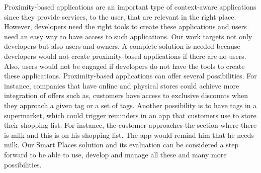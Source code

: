 Proximity-based applications are an important type of context-aware applications since they provide services, to the user, that are relevant in the right place.
However, developers need the right tools to create these applications and users need an easy way to have access to such applications.
Our work targets not only developers but also users and owners.
A complete solution is needed because developers would not create proximity-based applications if there are no users.
Also, users would not be engaged if developers do not have the tools to create these applications.
Proximity-based applications can offer several possibilities.
For instance, companies that have online and physical stores could achieve more integration of offers such as, customers have access to exclusive discounts when they approach a given tag or a set of tags.
Another possibility is to have tags in a supermarket, which could trigger reminders in an app that customers use to store their shopping list.
For instance, the customer approaches the section where there is milk and this is on his shopping list. The app would remind him that he needs milk.
Our Smart Places solution and its evaluation can be considered a step forward to be able to use, develop and manage all these and many more possibilities.

